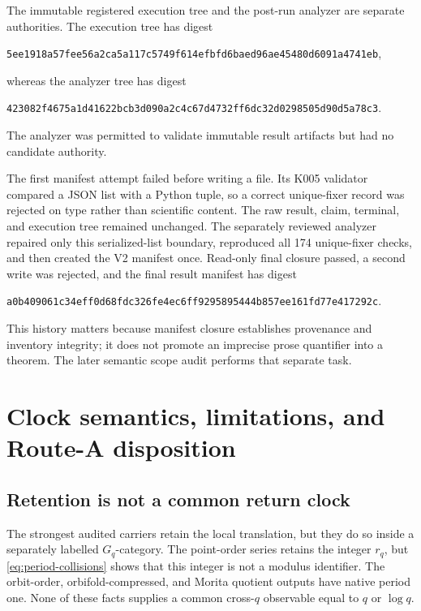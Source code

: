 \documentclass[11pt]{article}
\theoremstyle{definition}
\theoremstyle{remark}
\begin{document}
The immutable registered execution tree and the post-run analyzer are
separate authorities.  The execution tree has digest
\begin{center}
  \small
  \nolinkurl{5ee1918a57fee56a2ca5a117c5749f614efbfd6baed96ae45480d6091a4741eb},
\end{center}
whereas the analyzer tree has digest
\begin{center}
  \small
  \nolinkurl{423082f4675a1d41622bcb3d090a2c4c67d4732ff6dc32d0298505d90d5a78c3}.
\end{center}
The analyzer was permitted to validate immutable result artifacts but had no
candidate authority.

The first manifest attempt failed before writing a file.  Its K005 validator
compared a JSON list with a Python tuple, so a correct unique-fixer record was
rejected on type rather than scientific content.  The raw result, claim,
terminal, and execution tree remained unchanged.  The separately reviewed
analyzer repaired only this serialized-list boundary, reproduced all 174
unique-fixer checks, and then created the V2 manifest once.  Read-only final
closure passed, a second write was rejected, and the final result manifest
has digest
\begin{center}
  \small
  \nolinkurl{a0b409061c34eff0d68fdc326fe4ec6ff9295895444b857ee161fd77e417292c}.
\end{center}
This history matters because manifest closure establishes provenance and
inventory integrity; it does not promote an imprecise prose quantifier into
a theorem.  The later semantic scope audit performs that separate task.

\section{Clock semantics, limitations, and Route-A disposition}
\label{sec:discussion}

\subsection{Retention is not a common return clock}

The strongest audited carriers retain the local translation, but they do so
inside a separately labelled \(G_q\)-category.  The point-order series
retains the integer \(r_q\), but \eqref{eq:period-collisions} shows that this
integer is not a modulus identifier.  The orbit-order, orbifold-compressed,
and Morita quotient outputs have native period one.  None of these facts
supplies a common cross-\(q\) observable equal to \(q\) or \(\log q\).
\end{document}
